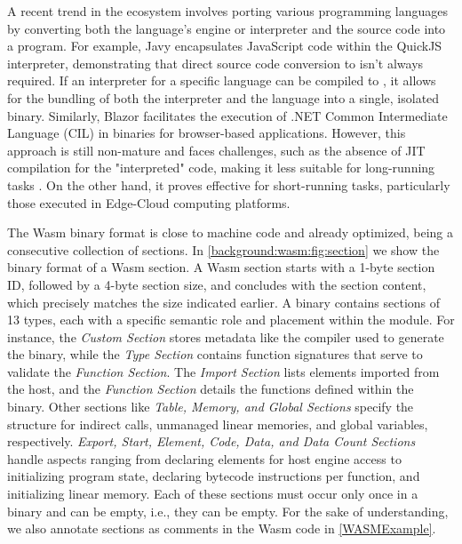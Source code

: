 A recent trend in the \Wasm ecosystem involves porting various programming languages by converting both the language's engine or interpreter and the source code into a \Wasm program. 
For example, Javy encapsulates JavaScript code within the QuickJS interpreter, demonstrating that direct source code conversion to \Wasm isn't always required. 
If an interpreter for a specific language can be compiled to \Wasm, it allows for the bundling of both the interpreter and the language into a single, isolated \Wasm binary. 
Similarly, Blazor facilitates the execution of .NET Common Intermediate Language (CIL) in \Wasm binaries for browser-based applications. 
However, this approach is still non-mature and faces challenges, such as the absence of JIT compilation for the "interpreted" code, making it less suitable for long-running tasks \cite{10.1145/3593434.3593454}. 
On the other hand, it proves effective for short-running tasks, particularly those executed in Edge-Cloud computing platforms.

\label{background:wasm:binary}

The Wasm binary format is close to machine code and already optimized, being a consecutive collection of sections.
In \autoref{background:wasm:fig:section} we show the binary format of a Wasm section.
A Wasm section starts with a 1-byte section ID, followed by a 4-byte section size, and concludes with the section content, which precisely matches the size indicated earlier.
A \wasm binary contains sections of 13 types, each with a specific semantic role and placement within the module. 
For instance, the \emph{Custom Section} stores metadata like the compiler used to generate the binary, while the \emph{Type Section} contains function signatures that serve to validate the \emph{Function Section}. 
The \emph{Import Section} lists elements imported from the host, and the \emph{Function Section} details the functions defined within the binary. 
Other sections like \emph{Table, Memory, and Global Sections} specify the structure for indirect calls, unmanaged linear memories, and global variables, respectively. 
\emph{Export, Start, Element, Code, Data, and Data Count Sections} handle aspects ranging from declaring elements for host engine access to initializing program state, declaring bytecode instructions per function, and initializing linear memory. 
Each of these sections must occur only once in a binary and can be empty, i.e., they can be empty.
For the sake of understanding, we also annotate sections as comments in the Wasm code in \autoref{WASMExample}.
    

